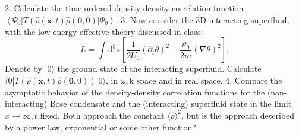 \documentclass[hyperref, a4paper]{article}
\begin{document}
2. Calculate the time ordered density-density correlation function $\left\langle\Psi_0\right| T\left(\hat{\rho}(\mathbf{x}, t) \hat{\rho}(\mathbf{0}, 0)\left|\Psi_0\right\rangle\right.$.
3. Now consider the 3D interacting superfluid, with the low-energy effective theory discussed in class:
$$
L=\int \mathrm{d}^3 \mathrm{x}\left[\frac{1}{2 U_0}\left(\partial_t \theta\right)^2-\frac{\rho_0}{2 m}(\nabla \theta)^2\right] .
$$
Denote by $|0\rangle$ the ground state of the interacting superfluid. Calculate $\langle 0|T(\hat{\rho}(\mathbf{x}, t) \hat{\rho}(\mathbf{0}, 0))| 0\rangle$, in $\omega, \mathrm{k}$ space and in real space.
4. Compare the asymptotic behavior of the density-density correlation functions for the (non-interacting) Bose condensate and the (interacting) superfluid state in the limit $x \rightarrow \infty, t$ fixed. Both approach the constant $\langle\hat{\rho}\rangle^2$, but is the approach described by a power law, exponential or some other function?
\end{document}
